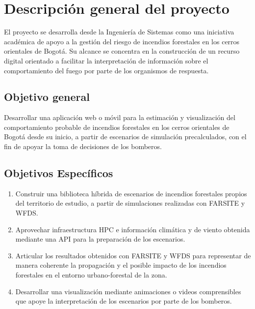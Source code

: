 \section{Descripción general del proyecto}

El proyecto se desarrolla desde la Ingeniería de Sistemas como una iniciativa académica de apoyo a la gestión del riesgo de incendios forestales en los cerros orientales de Bogotá. Su alcance se concentra en la construcción de un recurso digital orientado a facilitar la interpretación de información sobre el comportamiento del fuego por parte de los organismos de respuesta.

\subsection{Objetivo general}

Desarrollar una aplicación web o móvil para la estimación y visualización del comportamiento probable de incendios forestales en los cerros orientales de Bogotá desde su inicio, a partir de escenarios de simulación precalculados, con el fin de apoyar la toma de decisiones de los bomberos.

\subsection{Objetivos Específicos}

\begin{enumerate}
    \item Construir una biblioteca híbrida de escenarios de incendios forestales propios del territorio de estudio, a partir de simulaciones realizadas con FARSITE y WFDS.
    \item Aprovechar infraestructura HPC e información climática y de viento obtenida mediante una API para la preparación de los escenarios.
    \item Articular los resultados obtenidos con FARSITE y WFDS para representar de manera coherente la propagación y el posible impacto de los incendios forestales en el entorno urbano-forestal de la zona.
    \item Desarrollar una visualización mediante animaciones o videos comprensibles que apoye la interpretación de los escenarios por parte de los bomberos.
\end{enumerate}
